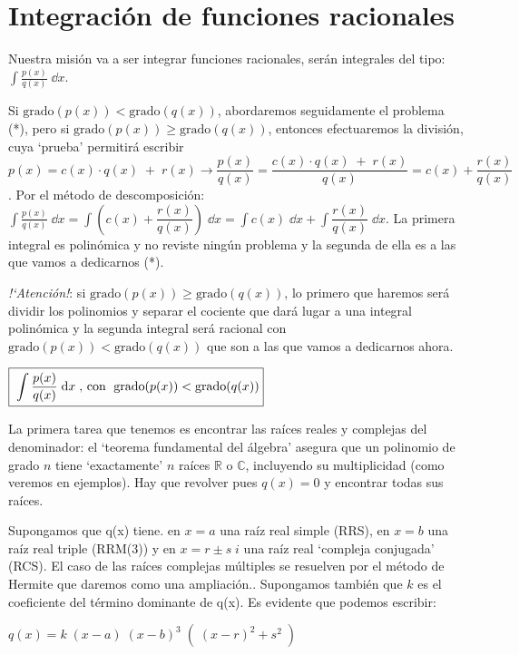\section{Integración de funciones racionales}

Nuestra misión va a ser integrar funciones racionales, serán integrales del tipo: $\displaystyle \int \frac {p(x)}{q(x)}\; \dd x$.

Si $\text{grado}(p(x)) < \text{grado} (q(x))$, abordaremos seguidamente el problema (*), pero si $\text{grado}(p(x)) \ge  \text{grado} (q(x))$, entonces efectuaremos la división, cuya `prueba' permitirá escribir $p(x)=c(x)\cdot q(x) \; + \; r(x) \to \dfrac {p(x)}{q(x)}= \dfrac {c(x)\cdot q(x) \; + \; r(x)}{q(x)}= c(x) + \dfrac {r(x)}{q(x)}$. Por el método de descomposición: 
$\displaystyle \int \frac {p(x)}{q(x)}\; \dd x = \int\left( c(x) + \dfrac {r(x)}{q(x)} \right) \; \dd x = \int c(x)\; \dd x + \int   \dfrac {r(x)}{q(x)} \; \dd x$. La primera integral es polinómica y no reviste ningún  problema y la segunda de ella es a las que vamos a dedicarnos (*).

\emph{!`Atención!}: si  $\text{grado}(p(x)) \ge  \text{grado} (q(x))$, lo primero que haremos será dividir los polinomios y separar el cociente que dará lugar a una integral polinómica y la segunda integral será racional con $\text{grado}(p(x)) < \text{grado} (q(x))$ que son a las que vamos a dedicarnos ahora.

\hspace{20mm} $\boxed {\; \displaystyle \int \frac {p(x)}{q(x)}\; \dd x\; $, con $\; \text{grado}(p(x)) < \text{grado} (q(x))} \; $

La primera tarea que tenemos es encontrar las raíces reales y complejas del denominador: el `teorema fundamental del álgebra' asegura que un polinomio de grado $n$ tiene `exactamente' $n$ raíces $\mathbb R$ o $\mathbb C$, incluyendo su multiplicidad (como veremos en ejemplos). Hay que revolver pues $q(x)=0$ y encontrar todas sus raíces.

Supongamos que q(x) tiene. en $x=a$ una raíz real simple (RRS), en $x=b$ una raíz real triple (RRM(3)) y en $x=r \pm s\; i$ una raíz real `compleja conjugada' (RCS). El caso de las raíces complejas múltiples se resuelven por el método de Hermite que daremos como una ampliación.. Supongamos también que $k$ es el coeficiente del término dominante de q(x). Es evidente que podemos escribir:

\centerline{$\displaystyle q(x)=k\; (x-a)\; (x-b)^3\;  \left(\;  (x-r)^2+s^2 \; \right)$}

